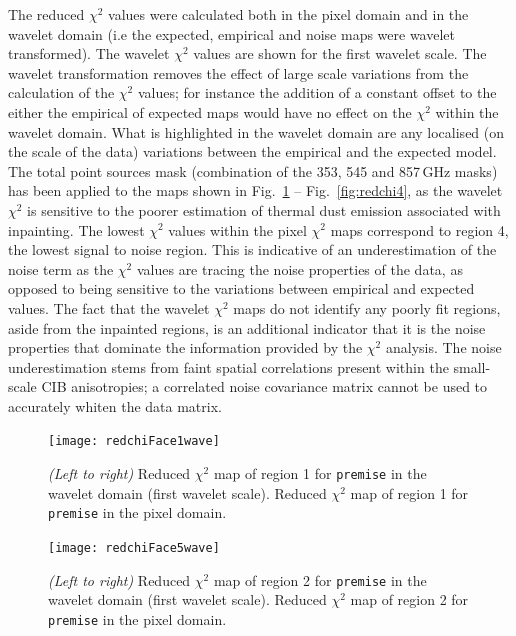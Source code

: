 \documentclass[a4paper,fleqn,usenatbib]{mnras}
\begin{document}
The reduced $\chi^{2}$ values were calculated both in the pixel domain and in the wavelet domain (i.e the expected, empirical and noise maps were wavelet transformed). The wavelet $\chi^{2}$ values are shown for the first wavelet scale. The wavelet transformation removes the effect of large scale variations from the calculation of the $\chi^{2}$ values; for instance the addition of a constant offset to the either the empirical of expected maps would have no effect on the $\chi^{2}$ within the wavelet domain. What is highlighted in the wavelet domain are any localised (on the scale of the data) variations between the empirical and the expected model. The total point sources mask (combination of the 353, 545 and 857\,GHz masks) has been applied to the maps shown in Fig.~\ref{fig:redchi1} -- Fig.~\ref{fig:redchi4}, as the wavelet $\chi^{2}$ is sensitive to the poorer estimation of thermal dust emission associated with inpainting. The lowest $\chi^{2}$ values within the pixel $\chi^{2}$ maps correspond to region 4, the lowest signal to noise region. This is indicative of an underestimation of the noise term as the $\chi^{2}$ values are tracing the noise properties of the data, as opposed to being sensitive to the variations between empirical and expected values. The fact that the wavelet $\chi^{2}$ maps do not identify any poorly fit regions, aside from the inpainted regions, is an additional indicator that it is the noise properties that dominate the information provided by the  $\chi^{2}$ analysis. The noise underestimation stems from faint spatial correlations present within the small-scale CIB anisotropies; a correlated noise covariance matrix cannot be used to accurately whiten the data matrix. 

\begin{figure}
\centering
\texttt{[image: redchiFace1wave]}
\caption{{\it{(Left to right)}} Reduced $\chi^{2}$ map of region 1 for {\texttt{premise}} in the wavelet domain (first wavelet scale). Reduced $\chi^{2}$ map of region 1 for {\texttt{premise}} in the pixel domain.}
\label{fig:redchi1}
\end{figure}

\begin{figure}
\centering
\texttt{[image: redchiFace5wave]}
\caption{{\it{(Left to right)}} Reduced $\chi^{2}$ map of region 2 for {\texttt{premise}} in the wavelet domain (first wavelet scale). Reduced $\chi^{2}$ map of region 2 for {\texttt{premise}} in the pixel domain.}
\label{fig:redchi2}
\end{figure}
\end{document}
